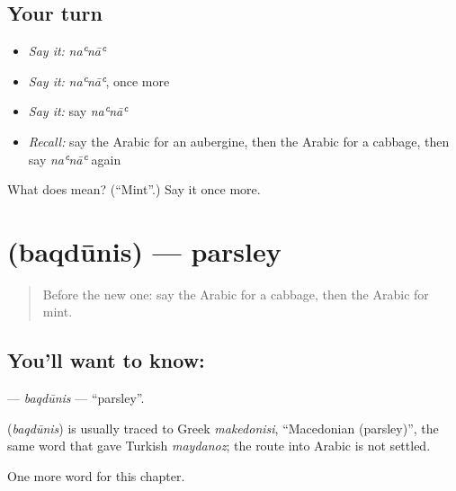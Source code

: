 \subsection*{Your turn}
\begin{itemize}
\raggedright
  \item \emph{Say it:} \emph{naʿnāʿ}
  \item \emph{Say it:} \emph{naʿnāʿ}, once more
  \item \emph{Say it:} say \emph{naʿnāʿ}
  \item \emph{Recall:} say the Arabic for an aubergine, then the Arabic for a cabbage, then say \emph{naʿnāʿ} again
\end{itemize}

\begin{tcolorbox}[breakable,colback=teal!4,colframe=teal!35!black,title={Before you move on}]
What does  mean? (\textquotedblleft{}Mint\textquotedblright{}.) Say it once more.
\end{tcolorbox}
\section[\texorpdfstring{\ar{بقدونس} (baqdūnis)}{بقدونس (baqdūnis)}]{ (baqdūnis) — parsley}

\label{lesson:AR-C121-baqdunis}



\begin{quote}
Before the new one: say the Arabic for a cabbage, then the Arabic for mint.
\end{quote}

\subsection*{You'll want to know: }
\textbf{} — \emph{baqdūnis} — \textquotedblleft{}parsley\textquotedblright{}.

\begin{cousinweb}
\textbf{} (\emph{baqdūnis}) is usually traced to Greek \emph{makedonisi}, \textquotedblleft{}Macedonian (parsley)\textquotedblright{}, the same word that gave Turkish \emph{maydanoz}; the route into Arabic is not settled.
\end{cousinweb}

\begin{grammarlens}[title={What you've built}]
One more word for this chapter.
\end{grammarlens}

